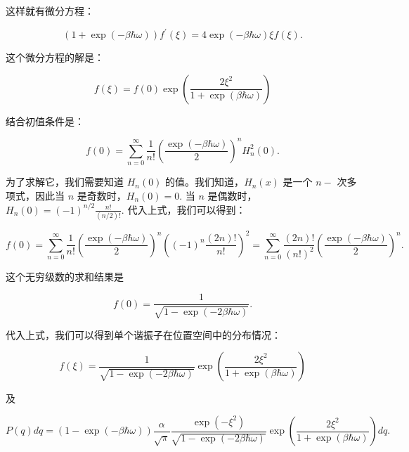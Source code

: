 这样就有微分方程：
\begin{linenomath}\begin{equation}
    \left(1 + \exp(-\beta\hbar\omega) \right)f^\prime(\xi) = 4\exp(-\beta\hbar\omega) \xi f\left( \xi \right).
\end{equation}\end{linenomath}
这个微分方程的解是：
\begin{linenomath}
    \begin{equation}
        f\left( \xi \right) = f\left( 0 \right) \exp\left( \frac{2\xi^2}{1+\exp\left( \beta\hbar\omega \right)} \right)
    \end{equation}
\end{linenomath}
结合初值条件是：
\begin{linenomath}
    \begin{equation}
        f\left( 0 \right) = \sum_{n=0}^\infty \frac1{n!}\left(\frac{\exp\left( -\beta\hbar\omega \right)}{2}\right)^n H_n^2(0).
    \end{equation}
\end{linenomath}
为了求解它，我们需要知道 $H_n(0)$ 的值。我们知道，$H_n(x)$ 是一个 $n-$ 次多项式，因此当 $n$ 是奇数时，$H_n(0) = 0$. 当 $n$ 是偶数时，$H_n(0) = (-1)^{n/2} \frac{n!}{(n/2)!}$. 代入上式，我们可以得到：
\begin{linenomath}
    \begin{equation}
        f\left( 0 \right) = \sum_{n=0}^\infty \frac1{n!}\left(\frac{\exp\left( -\beta\hbar\omega \right)}{2}\right)^n \left( (-1)^n \frac{(2n)!}{n!} \right)^2 = \sum_{n=0}^\infty \frac{(2n)!}{(n!)^2}\left(\frac{\exp\left( -\beta\hbar\omega \right)}{2}\right)^n.
    \end{equation}
\end{linenomath}
这个无穷级数的求和结果是 
\begin{linenomath}
    \begin{equation}
        f(0) = \frac{1}{\sqrt{1-\exp\left( -2\beta\hbar\omega \right)}}.
    \end{equation}
\end{linenomath}
代入上式，我们可以得到单个谐振子在位置空间中的分布情况：
\begin{linenomath}\begin{equation}
    f(\xi) = \frac{1}{\sqrt{1-\exp\left( -2\beta\hbar\omega \right)}} \exp\left( \frac{2\xi^2}{1+\exp\left( \beta\hbar\omega \right)} \right)
\end{equation}\end{linenomath}
及
\begin{linenomath}\begin{equation}
    P(q) dq = (1-\exp(-\beta\hbar \omega))\frac{\alpha}{\sqrt{\pi}} \frac{\exp\left( -\xi^2 \right)}{\sqrt{1-\exp\left( -2\beta\hbar\omega \right)}} \exp\left( \frac{2\xi^2}{1+\exp\left( \beta\hbar\omega \right)} \right) dq.
\end{equation}\end{linenomath}
